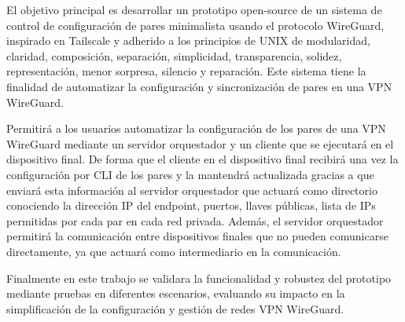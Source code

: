 
El objetivo principal es desarrollar un prototipo open-source de un sistema de control de configuración de pares minimalista usando el protocolo WireGuard, inspirado en Tailscale y adherido a los principios de UNIX de modularidad, claridad, composición, separación, simplicidad, transparencia, solidez, representación, menor sorpresa, silencio y reparación. Este sistema tiene la finalidad de automatizar la configuración y sincronización de pares en una VPN WireGuard.

Permitirá a los usuarios automatizar la configuración de los pares de una VPN WireGuard mediante un servidor orquestador y un cliente que se ejecutará en el dispositivo final. De forma que el cliente en el dispositivo final recibirá una vez la configuración por CLI de los pares y la mantendrá actualizada gracias a que enviará esta información al servidor orquestador que actuará como directorio conociendo la dirección IP del endpoint, puertos, llaves públicas, lista de IPs permitidas por cada par en cada red privada. Además, el servidor orquestador permitirá la comunicación entre dispositivos finales que no pueden comunicarse directamente, ya que actuará como intermediario en la comunicación.

Finalmente en este trabajo se validara la funcionalidad y robustez del prototipo mediante pruebas en diferentes escenarios, evaluando su impacto en la simplificación de la configuración y gestión de redes VPN WireGuard.